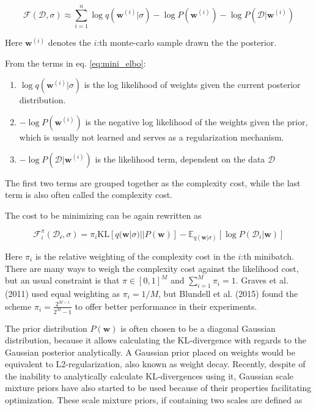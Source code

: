 	\begin{equation}
	\label{eq:mini_elbo}
	\mathcal{F}(\mathcal{D}, \sigma) \approx \sum_{i=1}^{n}\log q(\pmb{w}^{(i)}|\sigma) - \log P(\pmb{w}^{(i)}) - \log P(\mathcal{D}|\pmb{w}^{(i)})
	\end{equation}
	
	Here $\pmb{w}^{(i)}$ denotes the $i$:th monte-carlo sample drawn the the posterior.
	
	From the terms in eq. \ref{eq:mini_elbo}:
	\begin{enumerate}
		\item $\log q(\pmb{w}^{(i)}|\sigma)$ is the log likelihood of weights given the current posterior distribution.
		
		\item $-\log P(\pmb{w}^{(i)})$ is the negative log likelihood of the weights given the prior, which is usually not learned and serves as a regularization mechanism. 
		
		\item $- \log P(\mathcal{D}|\pmb{w}^{(i)})$ is the likelihood term, dependent on the data $\mathcal{D}$
	\end{enumerate}
	
	\vspace*{2mm}
	The first two terms are grouped together as the complexity cost, while the last term is also often called the complexity cost. 
	
	The cost to be minimizing can be again rewritten as 
	
	\begin{equation}
		\mathcal{F}^\pi_i(\mathcal{D_i}, \sigma) = \pi_i \text{KL}[q(\pmb{w}|\sigma) || P(\pmb{w})] - \mathbb{E}_{q(\pmb{w}|\sigma)}[\log P(\mathcal{D}_i|\pmb{w})]
	\end{equation}
	
	Here $\pi_i$ is the relative weighting of the complexity cost in the $i$:th minibatch. 
	There are many ways to weigh the complexity cost against the likelihood cost, but an usual constraint is that $\pi \in [0,1]^M$ and $\sum_{i=1}^{M} \pi_i = 1$. Graves et al. (2011) \cite{graves_practical_2011} used equal weighting as $\pi_i = 1/M$, but Blundell et al. (2015) \cite{blundell_weight_2015} found the scheme $\pi_i =\frac{2^{M-i}}{2^M - 1}$ to offer better performance in their experiments. 

	
	The prior distribution $P(\pmb{w})$ is often chosen to be a diagonal Gaussian distribution, because it allows calculating the KL-divergence with regards to the Gaussian posterior analytically. A Gaussian prior placed on weights would be equivalent to L2-regularization, also known as weight decay. Recently, despite of the inability to analytically calculate KL-divergences using it, Gaussian scale mixture priors have also started to be used \cite{blundell_weight_2015, shridhar_comprehensive_2019} because of their properties facilitating optimization. These scale mixture priors, if containing two scales are defined as 
	

